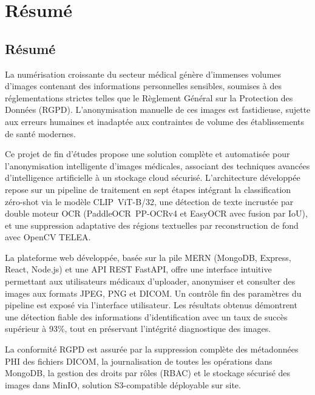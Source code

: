 \chapter*{Résumé}
\thispagestyle{empty}

\section*{Résumé}

La numérisation croissante du secteur médical génère d'immenses volumes d'images contenant des informations personnelles sensibles, soumises à des réglementations strictes telles que le Règlement Général sur la Protection des Données (RGPD). L'anonymisation manuelle de ces images est fastidieuse, sujette aux erreurs humaines et inadaptée aux contraintes de volume des établissements de santé modernes.

Ce projet de fin d'études propose une solution complète et automatisée pour l'anonymisation intelligente d'images médicales, associant des techniques avancées d'intelligence artificielle à un stockage cloud sécurisé. L'architecture développée repose sur un pipeline de traitement en sept étapes intégrant la classification zéro-shot via le modèle CLIP~ViT-B/32, une détection de texte incrustée par double moteur OCR (PaddleOCR~PP-OCRv4 et EasyOCR avec fusion par IoU), et une suppression adaptative des régions textuelles par reconstruction de fond avec OpenCV TELEA.

La plateforme web développée, basée sur la pile MERN (MongoDB, Express, React, Node.js) et une API REST FastAPI, offre une interface intuitive permettant aux utilisateurs médicaux d'uploader, anonymiser et consulter des images aux formats JPEG, PNG et DICOM. Un contrôle fin des paramètres du pipeline est exposé via l'interface utilisateur. Les résultats obtenus démontrent une détection fiable des informations d'identification avec un taux de succès supérieur à 93\%, tout en préservant l'intégrité diagnostique des images.

La conformité RGPD est assurée par la suppression complète des métadonnées PHI des fichiers DICOM, la journalisation de toutes les opérations dans MongoDB, la gestion des droits par rôles (RBAC) et le stockage sécurisé des images dans MinIO, solution S3-compatible déployable sur site.

